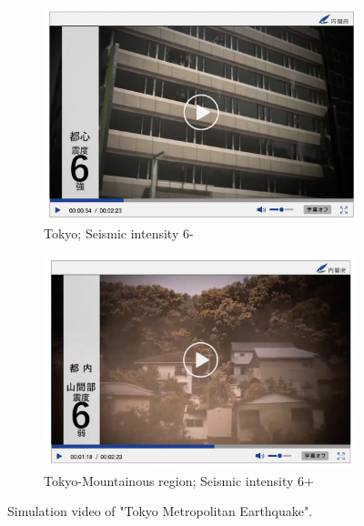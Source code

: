\begin{figure}[h]
\begin{subfigure}{0.32\textwidth}
    \includegraphics[width=\linewidth]{Figure/Figure5f.jpg}
    \caption{Tokyo; Seismic intensity 6-}
    \label{fig5f}
  \end{subfigure}
  \begin{subfigure}{0.32\textwidth}
    \centering
    \includegraphics[width=\linewidth]{Figure/Figure5g.jpg}
    \caption{Tokyo-Mountainous region; Seismic intensity 6+}
    \label{fig5g}
  \end{subfigure}
  \centering
  \caption[Simulation video of  "Tokyo Metropolitan Earthquake".]{Simulation video of "Tokyo Metropolitan Earthquake".\protect\footnotemark }
  \label{fig5}
\end{figure}


